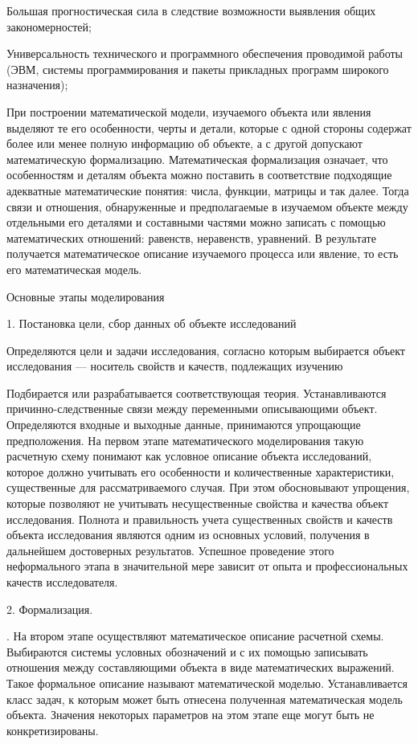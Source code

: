 Большая прогностическая сила в следствие возможности выявления общих закономерностей;


Универсальность технического и программного обеспечения проводимой работы (ЭВМ, системы программирования и пакеты прикладных программ широкого назначения);


При построении математической модели, изучаемого объекта или явления выделяют те его особенности, черты и детали, которые с одной стороны содержат более или менее полную информацию об объекте, а с другой допускают математическую формализацию. Математическая формализация означает, что особенностям и деталям объекта можно поставить в соответствие подходящие адекватные математические понятия: числа, функции, матрицы и так далее. Тогда связи и отношения, обнаруженные и предполагаемые в изучаемом объекте между отдельными его деталями и составными частями можно записать с помощью математических отношений: равенств, неравенств, уравнений. В результате получается математическое описание изучаемого процесса или явление, то есть его математическая модель.


Основные этапы моделирования


1. Постановка цели, сбор данных об объекте исследований


Определяются цели и задачи исследования, согласно которым выбирается объект исследования — носитель свойств и качеств, подлежащих изучению 


 Подбирается или разрабатывается соответствующая теория. Устанавливаются причинно-следственные связи между переменными описывающими объект. Определяются входные и выходные данные, принимаются упрощающие предположения. На первом этапе математического моделирования такую расчетную схему понимают как условное описание объекта исследований, которое должно учитывать его особенности и количественные характеристики, существенные для рассматриваемого случая. При этом обосновывают упрощения, которые позволяют не учитывать несущественные свойства и качества объект исследования.
Полнота и правильность учета существенных свойств и качеств объекта исследования являются одним из основных условий, получения в дальнейшем достоверных результатов. Успешное проведение этого неформального этапа в значительной мере зависит от опыта и профессиональных качеств исследователя.


2. Формализация.


. На втором этапе осуществляют математическое описание расчетной схемы. Выбираются системы условных обозначений и с их помощью записывать отношения между составляющими объекта в виде математических выражений. Такое формальное описание называют математической моделью. Устанавливается класс задач, к которым может быть отнесена полученная математическая модель объекта. Значения некоторых параметров на этом этапе еще могут быть не конкретизированы.



